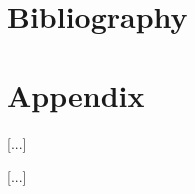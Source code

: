 \documentclass[a4paper]{article}
\begin{document}




\pagebreak

\section{Bibliography}
 


\section{Appendix}

[...]


[...]
\end{document}
